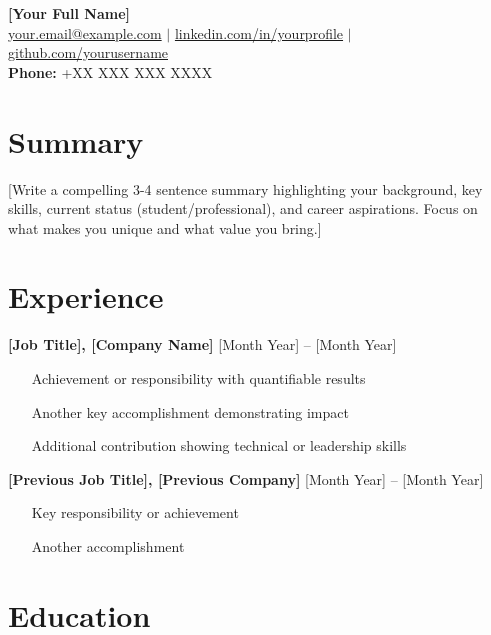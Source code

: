 \documentclass[10pt,letterpaper]{article}
\begin{document}
\begin{center}
{\LARGE \textbf{[Your Full Name]}} \\
\vspace{0.1cm}
\href{mailto:your.email@example.com}{your.email@example.com} $\vert$ \href{https://linkedin.com/in/yourprofile}{linkedin.com/in/yourprofile} $\vert$ \href{https://github.com/yourusername}{github.com/yourusername} \\
\textbf{Phone:} +XX XXX XXX XXXX
\end{center}

\section*{Summary}
[Write a compelling 3-4 sentence summary highlighting your background, key skills, current status (student/professional), and career aspirations. Focus on what makes you unique and what value you bring.]

\section*{Experience}
\textbf{[Job Title], [Company Name]} \hfill [Month Year] – [Month Year] \\
[City, Country]
\begin{itemize}[leftmargin=*, label={\color{darkgray}\textbullet}, itemsep=1pt]
    \item [Achievement or responsibility with quantifiable results]
    \item [Another key accomplishment demonstrating impact]
    \item [Additional contribution showing technical or leadership skills]
\end{itemize}

\vspace{0.2cm}

\textbf{[Previous Job Title], [Previous Company]} \hfill [Month Year] – [Month Year] \\
[City, Country]
\begin{itemize}[leftmargin=*, label={\color{darkgray}\textbullet}, itemsep=1pt]
    \item [Key responsibility or achievement]
    \item [Another accomplishment]
\end{itemize}

\section*{Education}
\end{document}
